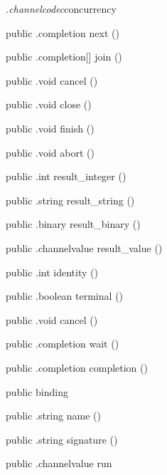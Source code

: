 \begin{CrexxClass}{\textit{.channelcodec}}{concurrency}
\begin{Members}
    \Method
      {public}
      {.completion}
      {next}
      {()}

    \Method
      {public}
      {.completion[]}
      {join}
      {()}

    \Method
      {public}
      {.void}
      {cancel}
      {()}

    \Method
      {public}
      {.void}
      {close}
      {()}

    \Method
      {public}
      {.void}
      {finish}
      {()}

    \Method
      {public}
      {.void}
      {abort}
      {()}

    \Method
      {public}
      {.int}
      {result\_integer}
      {()}

    \Method
      {public}
      {.string}
      {result\_string}
      {()}

    \Method
      {public}
      {.binary}
      {result\_binary}
      {()}

    \Method
      {public}
      {.channelvalue}
      {result\_value}
      {()}

    \Method
      {public}
      {.int}
      {identity}
      {()}

    \Method
      {public}
      {.boolean}
      {terminal}
      {()}

    \Method
      {public}
      {.void}
      {cancel}
      {()}

    \Method
      {public}
      {.completion}
      {wait}
      {()}

    \Method
      {public}
      {.completion}
      {completion}
      {()}

    \Factory
      {public}
      {binding}
      {}

    \Method
      {public}
      {.string}
      {name}
      {()}

    \Method
      {public}
      {.string}
      {signature}
      {()}

    \Method
      {public}
      {.channelvalue}
      {run}
      {}


\end{Members}
\end{CrexxClass}
